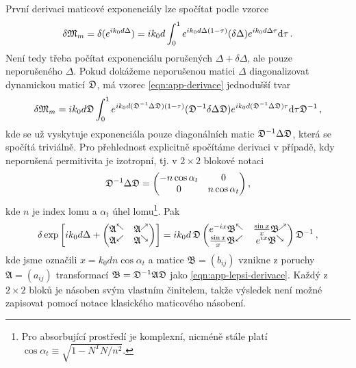 První derivaci maticové exponenciály lze spočítat podle vzorce\cite{najfeldDerivativesMatrixExponential1995a}
\begin{equation}
    \label{eqn:app-derivace}
    \delta\mathfrak{M}_m = \delta(e^{ik_0d\Delta}) = ik_0d\int_0^1 e^{ik_0d\Delta(1-\tau)} (\delta\Delta) e^{ik_0d\Delta \tau} \textrm{d}\tau \,.
\end{equation}
Není tedy třeba počítat exponenciálu porušených $\Delta+\delta\Delta$, ale pouze neporušeného $\Delta$.
Pokud dokážeme neporušenou matici $\Delta$ diagonalizovat dynamickou maticí $\mathfrak{D}$, má vzorec \eqref{eqn:app-derivace} jednodušší tvar
\begin{equation}
    \label{eqn:app-lepsi-derivace}
    \delta\mathfrak{M}_m = ik_0d \mathfrak{D} \int_0^1 e^{ik_0d (\mathfrak{D}^{-1}\Delta\mathfrak{D})(1-\tau)} (\mathfrak{D}^{-1}\delta\Delta\mathfrak{D}) e^{ik_0d(\mathfrak{D}^{-1}\Delta\mathfrak{D})\tau} \textrm{d}\tau \mathfrak{D}^{-1}\,,
\end{equation}
kde se už vyskytuje exponenciála pouze diagonálních matic $\mathfrak{D}^{-1}\Delta\mathfrak{D}$, která se spočítá triviálně.
Pro přehlednost explicitně spočítáme derivaci v případě, kdy neporušená permitivita je izotropní, tj. v $2\times2$ blokové notaci
\begin{equation}
    \mathfrak{D}^{-1}\Delta\mathfrak{D} = \begin{pmatrix} -n\cos\alpha_t & 0 \\ 0 & n\cos\alpha_t \end{pmatrix} ,
\end{equation}
kde $n$ je index lomu a $\alpha_t$ úhel lomu\footnote{Pro absorbující prostředí je komplexní, nicméně stále platí $\cos\alpha_t\equiv\sqrt{1-N^TN/n^2}$.}.
Pak
\begin{equation}
    \delta \exp \left[ik_0d\Delta+ \begin{pmatrix} 
\mathfrak{A}^\nwarrow & \mathfrak{A}^\nearrow \\
\mathfrak{A}^\swarrow & \mathfrak{A}^\searrow
\end{pmatrix} \right] = ik_0d \, \mathfrak{D}
\begin{pmatrix} 
    e^{-ix}\mathfrak{B}^\nwarrow & \frac{\sin x}{x}\mathfrak{B}^\nearrow \\
    \frac{\sin x}{x}\mathfrak{B}^\swarrow & e^{ix}\mathfrak{B}^\searrow
\end{pmatrix} \mathfrak{D}^{-1} \,,
\end{equation}
kde jsme označili $x = k_0 d n \cos\alpha_t$ a matice $\mathfrak{B} = (b_{ij})$ vznikne z poruchy $\mathfrak{A} = (a_{ij})$ transformací $\mathfrak{B} = \mathfrak{D}^{-1} \mathfrak{A} \mathfrak{D}$ jako \eqref{eqn:app-lepsi-derivace}.
Každý z $2\times2$ bloků je násoben svým vlastním činitelem, takže výsledek není možné zapisovat pomocí notace klasického maticového násobení.

